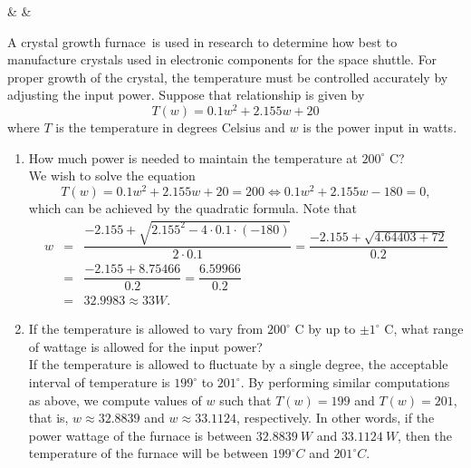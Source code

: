 \documentclass{book}
\begin{document}
\begin{Videos}
 &
  &
\end{Videos}

\begin{Exam} A crystal growth furnace\footnotemark\ is used in research to determine how best to manufacture crystals used in electronic components for the space shuttle. For proper growth of the crystal, the temperature must be controlled accurately by adjusting the input power. Suppose that relationship is given by \[T(w) = 0.1w^2 + 2.155w + 20\] where $T$ is the temperature in degrees Celsius and $w$ is the power input in watts.
\begin{enumerate}
\item How much power is needed to maintain the temperature at $200^\circ$ C?\\

We wish to solve the equation \[T(w) = 0.1w^2 + 2.155w + 20 = 200 \Longleftrightarrow 0.1w^2 + 2.155w - 180=0,\] which can be achieved by the quadratic formula. Note that 
\begin{eqnarray*}
w &=& \dfrac{-2.155 + \sqrt{2.155^2 - 4\cdot 0.1\cdot (-180)}}{2\cdot 0.1} =  \dfrac{-2.155 + \sqrt{4.64403 + 72}}{0.2}\\
& = &  \dfrac{-2.155 + 8.75466}{0.2} = \dfrac{6.59966}{0.2}\\
& =& 32.9983 \approx 33 W.
\end{eqnarray*}

\item If the temperature is allowed to vary from $200^\circ$ C by up to $\pm 1^\circ$ C, what range of wattage is allowed for the input power?\\

If the temperature is allowed to fluctuate by a single degree, the acceptable interval of temperature is $199^\circ$ to $201^\circ$. By performing similar computations as above, we compute values of $w$ such that $T(w) = 199$ and $T(w) = 201$, that is, $w \approx 32.8839$ and  $w \approx 33.1124$, respectively. In other words, if the power wattage of the furnace is between $32.8839\ W$ and $33.1124\ W$, then the temperature of the furnace will be between $199^\circ C$ and $201^\circ C$. 
\end{enumerate}
\end{Exam}\vs
\end{document}
